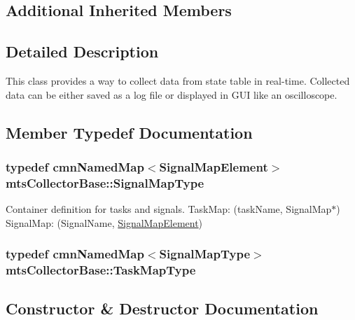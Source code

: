 \subsection*{Additional Inherited Members}


\subsection{Detailed Description}
This class provides a way to collect data from state table in real-\/time. Collected data can be either saved as a log file or displayed in G\+U\+I like an oscilloscope. 

\subsection{Member Typedef Documentation}
\hypertarget{classmts_collector_base_ad4d928af971d864065a9a6d9650a4050}{}
\subsubsection[{Signal\+Map\+Type}]{\setlength{\rightskip}{0pt plus 5cm}typedef {\bf cmn\+Named\+Map}$<${\bf Signal\+Map\+Element}$>$ {\bf mts\+Collector\+Base\+::\+Signal\+Map\+Type}\hspace{0.3cm}{\ttfamily [protected]}}\label{classmts_collector_base_ad4d928af971d864065a9a6d9650a4050}
Container definition for tasks and signals. Task\+Map\+: (task\+Name, Signal\+Map$\ast$) Signal\+Map\+: (Signal\+Name, \hyperlink{classmts_collector_base_1_1_signal_map_element}{Signal\+Map\+Element}) \hypertarget{classmts_collector_base_a6b47b3df8797f600ac9791640561f035}{}
\subsubsection[{Task\+Map\+Type}]{\setlength{\rightskip}{0pt plus 5cm}typedef {\bf cmn\+Named\+Map}$<${\bf Signal\+Map\+Type}$>$ {\bf mts\+Collector\+Base\+::\+Task\+Map\+Type}\hspace{0.3cm}{\ttfamily [protected]}}\label{classmts_collector_base_a6b47b3df8797f600ac9791640561f035}


\subsection{Constructor \& Destructor Documentation}
\hypertarget{classmts_collector_base_a60f7407181c031a8e8c57fdd48c4e6c7}{}
